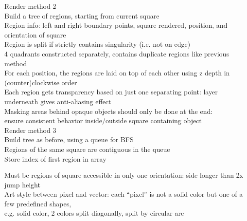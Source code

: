 \documentclass{article}
\begin{document}
Render method 2 \\
Build a tree of regions, starting from current square \\
Region info: left and right boundary points, square rendered,
position, and orientation of square \\
Region is split if strictly contains singularity (i.e. not on edge) \\
4 quadrants constructed separately,
contains duplicate regions like previous method \\
For each position, the regions are laid on top of each other using z depth
in (counter)clockwise order \\
Each region gets transparency based on just one separating point:
layer underneath gives anti-aliasing effect \\
Masking areas behind opaque objects should only be done at the end: \\
ensure consistent behavior inside/outside square containing object \\

Render method 3 \\
Build tree as before, using a queue for BFS \\
Regions of the same square are contiguous in the queue \\
Store index of first region in array

Must be regions of square accessible in only one orientation:
side longer than 2x jump height \\

Art style between pixel and vector:
each ``pixel'' is not a solid color but one of a few predefined shapes, \\
e.g. solid color, 2 colors split diagonally, split by circular arc \\
\end{document}
